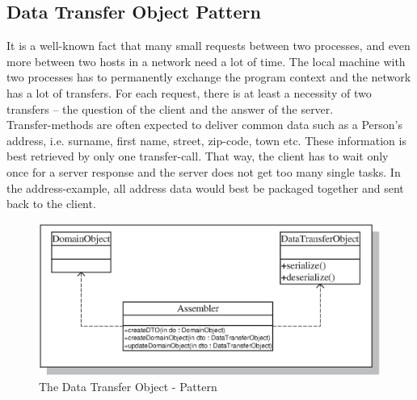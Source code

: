 \subsection{Data Transfer Object Pattern}
\label{data_transfer_object_pattern_section}

It is a well-known fact that many small requests between two processes, and even
more between two hosts in a network need a lot of time. The local machine with
two processes has to permanently exchange the program context and the network
has a lot of transfers. For each request, there is at least a necessity of two
transfers -- the question of the client and the answer of the server.\\
Transfer-methods are often expected to deliver common data such as a Person's
address, i.e. surname, first name, street, zip-code, town etc. These information
is best retrieved by only one transfer-call. That way, the client has to wait
only once for a server response and the server does not get too many single tasks.
In the address-example, all address data would best be packaged together and
sent back to the client.

\begin{figure}[ht]
    \begin{center}
       \includegraphics[scale=0.5]{images/data_transfer_object_pattern.eps}
       \caption{The Data Transfer Object - Pattern \cite{enterprisepattern}}
       \label{datatransferobject_figure}
    \end{center}
\end{figure}

